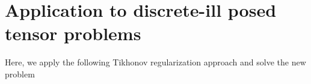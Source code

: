 \documentclass{siamltex}
\newcommand{\1}{\mathbb{1}}
\newcommand{\0}{\mathbb{0}}
\begin{document}
	
	
	\section{Application to discrete-ill posed tensor problems}
 Here, we apply the following Tikhonov regularization approach and solve the new problem
	
\end{document}
